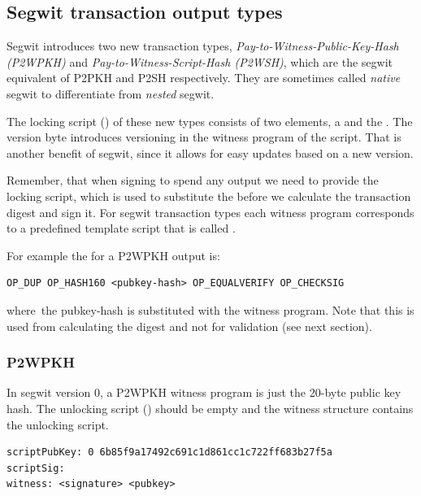 \subsection*{Segwit transaction output types}
Segwit introduces two new transaction types, \emph{Pay-to-Witness-Public-Key-Hash (P2WPKH)} and \emph{Pay-to-Witness-Script-Hash (P2WSH)}, which are the segwit equivalent of P2PKH and P2SH respectively. They are sometimes called \emph{native} segwit to differentiate from \emph{nested} segwit.

The locking script () of these new types consists of two elements, a  and the . The version byte introduces versioning in the witness program of the script. That is another benefit of segwit, since it allows for easy updates based on a new version.

Remember, that when signing to spend any output we need to provide the locking script, which is used to substitute the  before we calculate the transaction digest and sign it. For segwit transaction types each witness program corresponds to a predefined template script that is called .

For example the  for a P2WPKH output is:

\begin{emphbox}
\begin{lstlisting}[style=Pseudomath]
OP_DUP OP_HASH160 <pubkey-hash> OP_EQUALVERIFY OP_CHECKSIG
\end{lstlisting}
\end{emphbox}

where the pubkey-hash is substituted with the witness program. Note that this is used from calculating the digest and not for validation (see next section).

\subsubsection*{P2WPKH}
In segwit version 0, a P2WPKH witness program is just the 20-byte public key hash. The unlocking script () should be empty and the witness structure contains the unlocking script.

\begin{emphbox}
\begin{lstlisting}[style=Pseudomath]
scriptPubKey: 0 6b85f9a17492c691c1d861cc1c722ff683b27f5a
scriptSig:
witness: <signature> <pubkey>
\end{lstlisting}
\end{emphbox}

